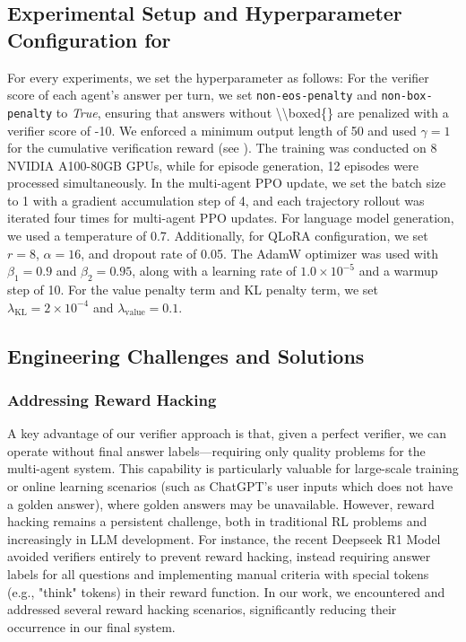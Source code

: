 \subsection{Experimental Setup and Hyperparameter Configuration for \ours}
For every experiments, we set the hyperparameter as follows: 
For the verifier score of each agent's answer per turn, we set \texttt{non-eos-penalty} and \texttt{non-box-penalty} to \textit{True}, ensuring that answers without \textbackslash\textbackslash boxed\{\} are penalized with a verifier score of -10. We enforced a minimum output length of 50 and used \(\gamma = 1\) for the cumulative verification reward (see ). The training was conducted on 8 NVIDIA A100-80GB GPUs, while for episode generation, 12 episodes were processed simultaneously. In the multi-agent PPO update, we set the batch size to 1 with a gradient accumulation step of 4, and each trajectory rollout was iterated four times for multi-agent PPO updates. For language model generation, we used a temperature of 0.7. Additionally, for QLoRA configuration, we set \( r = 8 \), \( \alpha = 16 \), and dropout rate of 0.05. The AdamW optimizer \citep{loshchilov2017decoupled} was used with \(\beta_1 = 0.9\) and \(\beta_2 = 0.95\), along with a learning rate of \(1.0 \times 10^{-5}\) and a warmup step of 10. For the value penalty term and KL penalty term, we set \(\lambda_{\text{KL}}= 2 \times 10^{-4}\) and \(\lambda_{\text{value}} = 0.1\).
\subsection{Engineering Challenges and Solutions}
\subsubsection{Addressing Reward Hacking}
A key advantage of our verifier approach is that, given a perfect verifier, we can operate without final answer labels—requiring only quality problems for the multi-agent system. This capability is particularly valuable for large-scale training or online learning scenarios (such as ChatGPT's user inputs which does not have a golden answer), where golden answers may be unavailable. However, reward hacking remains a persistent challenge, both in traditional RL problems \citep{amodei2016concrete, hadfield2017inverse} and increasingly in LLM development. For instance, the recent Deepseek R1 Model \citep{guo2025deepseek} avoided verifiers entirely to prevent reward hacking, instead requiring answer labels for all questions and implementing manual criteria with special tokens (e.g., "think" tokens) in their reward function. In our work, we encountered and addressed several reward hacking scenarios, significantly reducing their occurrence in our final system.
